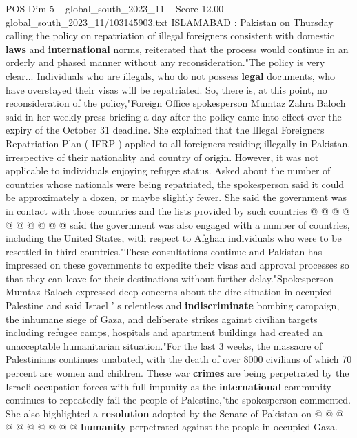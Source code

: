 \begin{textsample}{POS Dim 5 – global\_south\_2023\_11 – Score 12.00 – global\_south\_2023\_11/103145903.txt}  \label{ex:f5_pos_256}
ISLAMABAD : Pakistan on Thursday calling the policy on repatriation of illegal foreigners consistent with domestic \textbf{laws} and \textbf{international} norms, reiterated that the process would continue in an orderly and phased manner without any reconsideration."The policy is very clear...
Individuals who are illegals, who do not possess \textbf{legal} documents, who have overstayed their visas will be repatriated.
So, there is, at this point, no reconsideration of the policy,"Foreign Office spokesperson Mumtaz Zahra Baloch said in her weekly press briefing a day after the policy came into effect over the expiry of the October 31 deadline.
She explained that the Illegal Foreigners Repatriation Plan ( IFRP ) applied to all foreigners residing illegally in Pakistan, irrespective of their nationality and country of origin.
However, it was not applicable to individuals enjoying refugee status.
Asked about the number of countries whose nationals were being repatriated, the spokesperson said it could be approximately a dozen, or maybe slightly fewer.
She said the government was in contact with those countries and the lists provided by such countries @ @ @ @ @ @ @ @ @ @ said the government was also engaged with a number of countries, including the United States, with respect to Afghan individuals who were to be resettled in third countries."These consultations continue and Pakistan has impressed on these governments to expedite their visas and approval processes so that they can leave for their destinations without further delay."Spokesperson Mumtaz Baloch expressed deep concerns about the dire situation in occupied Palestine and said Israel ' s relentless and \textbf{indiscriminate} bombing campaign, the inhumane siege of Gaza, and deliberate strikes against civilian targets including refugee camps, hospitals and apartment buildings had created an unacceptable humanitarian situation."For the last 3 weeks, the massacre of Palestinians continues unabated, with the death of over 8000 civilians of which 70 percent are women and children.
These war \textbf{crimes} are being perpetrated by the Israeli occupation forces with full impunity as the \textbf{international} community continues to repeatedly fail the people of Palestine,"the spokesperson commented.
She also highlighted a \textbf{resolution} adopted by the Senate of Pakistan on @ @ @ @ @ @ @ @ @ @ \textbf{humanity} perpetrated against the people in occupied Gaza.

\end{textsample}

